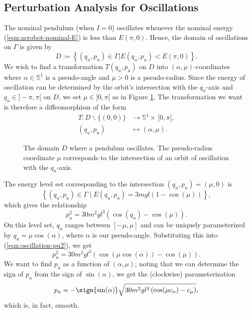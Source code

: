 \subsection*{Perturbation Analysis for Oscillations}
The nominal pendulum (\ie when \(I = 0\)) oscillates whenever the
nominal energy (\ref{eqn:acrobot-nominal-E}) is less than \(E(\pi,0)\).
Hence, the domain of oscillations on \(\Gamma\) is given by
\[
    D := \left\{ (q_u,p_u) \in \Gamma | E(q_u,p_u) < E(\pi,0)\right\}
    .
\]
We wish to find a transformation \(T(q_u,p_u)\) on \(D\) into
\((\alpha,\mu)\)-coordinates where \(\alpha \in \mathbb{S}^1\) is a pseudo-angle
and \(\mu > 0\) is a pseudo-radius.
Since the energy of oscillation can be determined by the orbit's intersection
with the \(q_u\)-axis and \(q_u \in ]-\pi,\pi[\) on \(D\), 
we set \(\mu \in ]0,\pi[\) as in Figure \ref{fig:mu-intersection}.
The transformation we want is therefore a diffeomorphism of the form
\begin{align*}
    T : D\backslash \{(0,0)\} &\rightarrow \mathbb{S}^1 \times \, ]0,\pi], \\
    (q_u, p_u) &\mapsto (\alpha,\mu)
    .
\end{align*}

\begin{figure}
    \centering
    \caption{The domain \(D\) where a pendulum oscillates.
    The pseudo-radius coordinate \(\mu\) corresponds to the
    intersection of an orbit of oscillation with the \(q_u\)-axis.}
    \label{fig:mu-intersection}
\end{figure}

The energy level set corresponding to the intersection \((q_u,p_u) = (\mu,0)\)
is 
\[
    \left\{(q_u,p_u) \in \Gamma \mid E(q_u,p_u) = 3mgl(1- \cos(\mu))\right\}
    ,
\]
which gives the relationship
\begin{equation}\label{eqn:oscillation-pu2}
    p_u^2 = 30m^2gl^3(\cos(q_u) - \cos(\mu))
    .
\end{equation}
On this level set, \(q_u\) ranges between \([-\mu,\mu]\) and can be uniquely
parameterized by \(q_u = \mu \cos(\alpha)\), where \(\alpha\) is our
pseudo-angle.
Substituting this into (\ref{eqn:oscillation-pu2}), we get
\[
    p_u^2 = 30m^2gl^3(\cos(\mu \cos(\alpha)) - \cos(\mu))
    .
\]
We want to find \(p_u\) as a function of \((\alpha,\mu)\); noting that we can
determine the sign of \(p_u\) from the sign of \(\sin(\alpha)\), we get the
(clockwise) parameterization
\begin{equation}\label{eqn:oscillation-pu}
    p_u = -\sign{\sin(\alpha)} \sqrt{30m^2gl^3 \left(\cos(\mu c_\alpha) - c_\mu\right)}
    ,
\end{equation}
which is, in fact, smooth.

